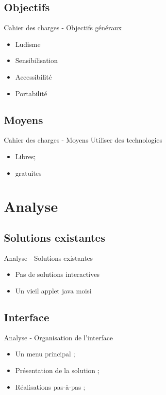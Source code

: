 \documentclass{beamer}
\begin{document}
	\subsection{Objectifs}
		\begin{frame}{Cahier des charges - Objectifs généraux}
			\begin{itemize}\setlength{\itemsep}{0.75cm}
                \item Ludisme
                \item Sensibilisation
                \item Accessibilité
                \item Portabilité
			\end{itemize}
		\end{frame}
	\subsection{Moyens}
		\begin{frame}{Cahier des charges - Moyens}
		    Utiliser des technologies
			\begin{itemize}
				\item Libres;
				\item gratuites
			\end{itemize}
		\end{frame}
\section{Analyse}
	\subsection{Solutions existantes}
		\begin{frame}{Analyse - Solutions existantes }
		\begin{itemize}
            \item Pas de solutions interactives
            \item Un vieil applet java moisi
        \end{itemize}
		\end{frame}
	\subsection{Interface}
		\begin{frame}{Analyse - Organisation de l'interface}
			\begin{itemize}
				\setlength{\itemsep}{0.5cm}
				\item Un menu principal ;
				\item Présentation de la solution ;
				\item Réalisations pas-à-pas ;
			\end{itemize}
		\end{frame}
\end{document}
